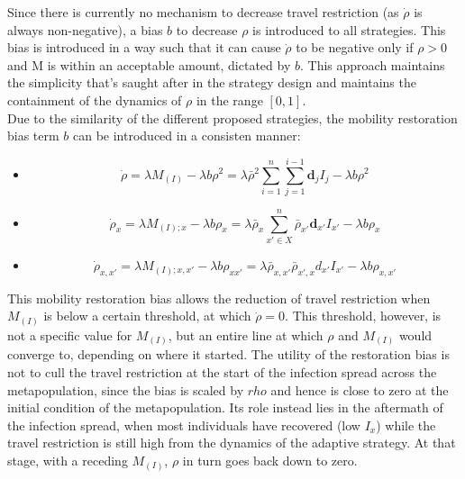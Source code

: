 Since there is currently no mechanism to decrease travel restriction (as $\dot \rho$ is always non-negative), a bias $b$ to decrease $\rho$ is introduced to all strategies. This bias is introduced in a way such that it can cause $\dot \rho$ to be negative only if $\rho>0$ and M is within an acceptable amount, dictated by $b$. This approach maintains the simplicity that's saught after in the strategy design and maintains the containment of the dynamics of $\rho$ in the range $[0,1]$.\\

Due to the similarity of the different proposed strategies, the mobility restoration bias term $b$ can be introduced in a consisten manner:
\begin{itemize}
    \item {}
     \begin{equation}\dot{\rho} = \lambda M_{(I)} - \lambda b \rho^2 = \lambda \bar{\rho}^2 \sum_{i=1}^{n} \sum_{j=1}^{i-1}  \mathbf{d}_{j} I_{j} - \lambda b \rho^2 \label{global bias}\end{equation}
    \item {} \begin{equation}\dot{\rho}_x = \lambda M_{(I);x} - \lambda b \rho_{x}= \lambda \bar{\rho}_x \sum_{x' \in X}^{n} \bar{\rho}_{x'} \mathbf{d}_{x'} I_{x'} - \lambda b \rho_x\end{equation}
    \item {} \begin{equation}\dot{\rho}_{x,x'} = \lambda M_{(I);x,x'} - \lambda b \rho_{xx'}= \lambda \bar{\rho}_{x,x'} \bar{\rho}_{x',x} d_{x'} I_{x'} - \lambda b \rho_{x,x'}\end{equation}

\end{itemize}

This mobility restoration bias allows the reduction of travel restriction when $M_{(I)}$ is below a certain threshold, at which $\dot \rho=0$. This threshold, however, is not a specific value for $M_{(I)}$, but an entire line at which $\rho$ and $M_{(I)}$ would converge to, depending on where it started. The utility of the restoration bias is not to cull the travel restriction at the start of the infection spread across the metapopulation, since the bias is scaled by $rho$ and hence is close to zero at the initial condition of the metapopulation. Its role instead lies in the aftermath of the infection spread, when most individuals have recovered (low $I_x$) while the travel restriction is still high from the dynamics of the adaptive strategy. At that stage, with a receding $M_{(I)}$, $\rho$ in turn goes back down to zero.


